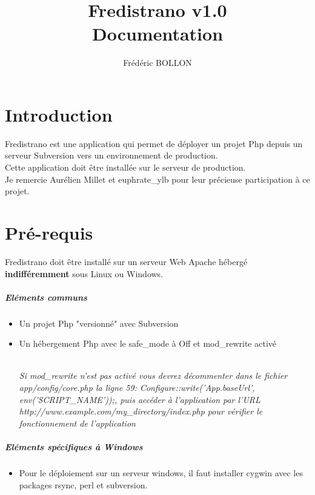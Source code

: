 \documentclass[12pt,a4paper]{report}
\author{Frédéric BOLLON}
\title{Fredistrano v1.0\\Documentation\\}
\begin{document}
\maketitle
\tableofcontents

\chapter{Introduction}
Fredistrano est une application qui permet de déployer un projet Php depuis un serveur Subversion vers un environnement de production.\\
Cette application doit \^{e}tre installée sur le serveur de production.\\

Je remercie Aurélien Millet et euphrate\_ylb pour leur précieuse participation à ce projet.

\chapter{Pré-requis}

Fredistrano doit \^{e}tre installé sur un serveur Web Apache hébergé \textbf{indifféremment} sous Linux ou Windows. 

\paragraph*{Eléments communs}
\begin{itemize}
\item
Un projet Php "versionné" avec Subversion
\item 
Un hébergement Php avec le safe\_mode à Off et mod\_rewrite activé	\\\\
\begin{small}\textit{Si mod\_rewrite n'est pas activé vous devrez décommenter dans le fichier app/config/core.php la ligne 59: Configure::write('App.baseUrl', env('SCRIPT\_NAME'));, puis accéder à l'application par l'URL\\ http://www.example.com/my\_directory/index.php pour vérifier le fonctionnement de l'application}\end{small}
\end{itemize}

\paragraph*{Eléments spécifiques à Windows}
\begin{itemize}
\item
Pour le déploiement sur un serveur windows, il faut installer cygwin avec les packages rsync, perl et subversion.

\end{itemize}
\end{document}
